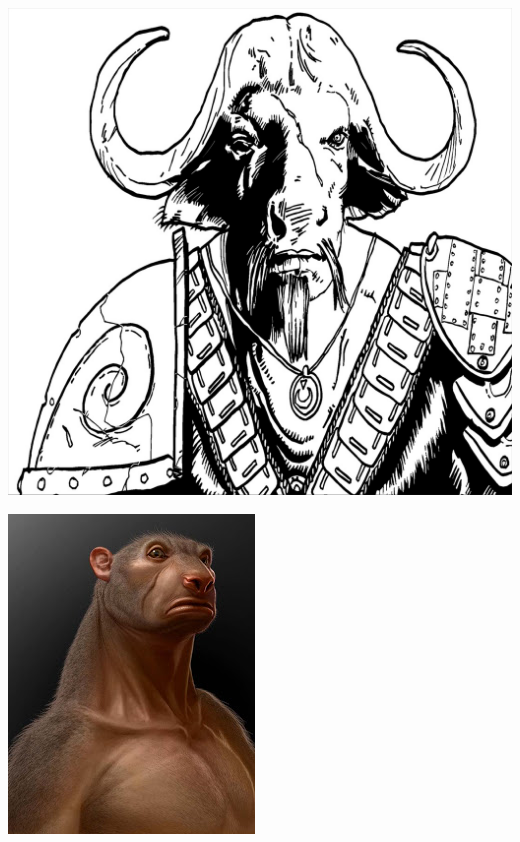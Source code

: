 \documentclass[10pt,twoside]{article}
\begin{document}
\begin{multicols}{2}
  \includegraphics[width=\linewidth]{TCP-Armored-6}

  \includegraphics[width=\linewidth]{charlesliu_bearman.jpg}

  \end{multicols}
\end{document}
